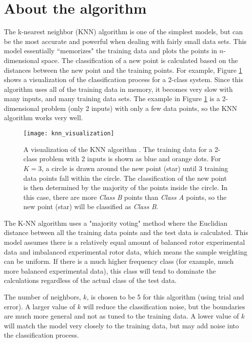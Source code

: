 \section{About the algorithm}
The k-nearest neighbor (KNN) algorithm is one of the simplest models, but can be the most accurate and powerful when dealing with fairly small data sets.  This model essentially ``memorizes" the training data and plots the points in $n$-dimensional space.  The classification of a new point is calculated based on the distances between the new point and the training points.  For example, Figure \ref{fig:knn_visualization} shows a visualization of the classification process for a 2-class system.  Since this algorithm uses all of the training data in memory, it becomes very slow with many inputs, and many training data sets.  The example in Figure \ref{fig:knn_visualization} is a 2-dimensional problem (only 2 inputs) with only a few data points, so the KNN algorithm works very well.


\begin{figure}
	\centering
	\texttt{[image: knn\_visualization]}
	\decoRule
	\caption{A visualization of the KNN algorithm \cite{knn_python}.  The training data for a 2-class problem with 2 inputs is shown as blue and orange dots.  For $K=3$, a circle is drawn around the new point (star) until 3 training data points fall within the circle.  The classification of the new point is then determined by the majority of the points inside the circle.  In this case, there are more \textit{Class B} points than \textit{Class A} points, so the new point (star) will be classified as \textit{Class B}.}
	\label{fig:knn_visualization}
\end{figure}

The K-NN algorithm uses a "majority voting" method where the Euclidian distance between all the training data points and the test data is calculated.  This model assumes there is a relatively equal amount of balanced rotor experimental data and imbalanced experimental rotor data, which means the sample weighting can be uniform.  If there is a much higher frequency class (for example, much more balanced experimental data), this class will tend to dominate the calculations regardless of the actual class of the test data.

The number of neighbors, $k$, is chosen to be 5 for this algorithm (using trial and error).  A larger value of $k$ will reduce the classification noise, but the boundaries are much more general and not as tuned to the training data.  A lower value of $k$ will match the model very closely to the training data, but may add noise into the classification process.

